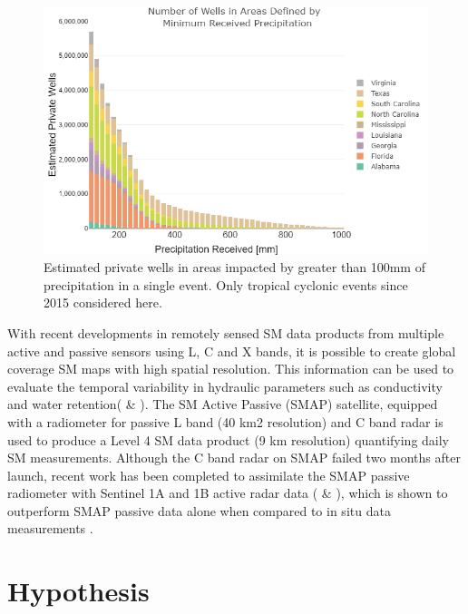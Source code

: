 \documentclass[
]{book}
\begin{document}
\begin{figure}
\includegraphics[width=1\linewidth]{img/pptWellsBar} \caption{Estimated private wells in areas impacted by greater than 100mm of precipitation in a single event. Only tropical cyclonic events since 2015 considered here.}\label{fig:pptWellsBar}
\end{figure}

With recent developments in remotely sensed SM data products from multiple active and passive sensors using L, C and X bands, it is possible to create global coverage SM maps with high spatial resolution\citep{mohanty2017}. This information can be used to evaluate the temporal variability in hydraulic parameters such as conductivity and water retention(\citet{ahuja1993} \& \citet{chen1993}). The SM Active Passive (SMAP) satellite, equipped with a radiometer for passive L band (40 km2 resolution) and C band radar is used to produce a Level 4 SM data product (9 km resolution) quantifying daily SM measurements\citep{reichle2017}. Although the C band radar on SMAP failed two months after launch, recent work has been completed to assimilate the SMAP passive radiometer with Sentinel 1A and 1B active radar data (\citet{das2018} \& \citet{santi2018}), which is shown to outperform SMAP passive data alone when compared to in situ data measurements \citep{lievens2017}.

\hypertarget{hypothesis}{%
\chapter{Hypothesis}\label{hypothesis}}
\end{document}
